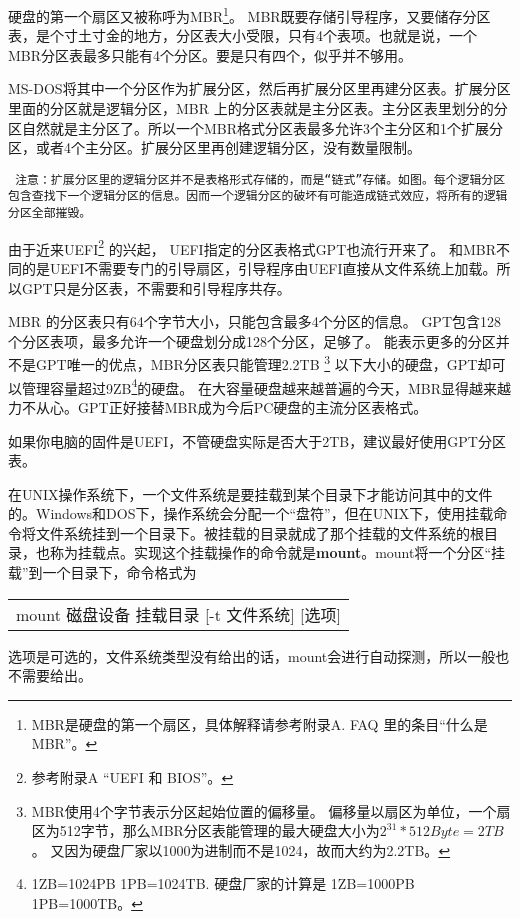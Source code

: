 \documentclass[amstex,twoside]{ctexbook}
\newenvironment{notice}{\tt}{}
\newenvironment{code}{\small\tt\begin{longtable}{p{0.8\textwidth}}}{\end{longtable}}
\begin{document}
硬盘的第一个扇区又被称呼为MBR\footnote{MBR是硬盘的第一个扇区，具体解释请参考附录A. FAQ 里的条目“什么是 MBR”。}。
MBR既要存储引导程序，又要储存分区表，是个寸土寸金的地方，分区表大小受限，只有4个表项。也就是说，一个 MBR分区表最多只能有4个分区。要是只有四个，似乎并不够用。

MS-DOS将其中一个分区作为扩展分区，然后再扩展分区里再建分区表。扩展分区里面的分区就是逻辑分区，MBR 上的分区表就是主分区表。主分区表里划分的分区自然就是主分区了。所以一个MBR格式分区表最多允许3个主分区和1个扩展分区，或者4个主分区。扩展分区里再创建逻辑分区，没有数量限制。

\begin{notice}
注意：扩展分区里的逻辑分区并不是表格形式存储的，而是“链式”存储。如图。每个逻辑分区包含查找下一个逻辑分区的信息。因而一个逻辑分区的破坏有可能造成链式效应，将所有的逻辑分区全部摧毁。
\end{notice}

由于近来UEFI\footnote{参考附录A “UEFI 和 BIOS”。}  的兴起，
UEFI指定的分区表格式GPT也流行开来了。
和MBR不同的是UEFI不需要专门的引导扇区，引导程序由UEFI直接从文件系统上加载。所以GPT只是分区表，不需要和引导程序共存。

MBR 的分区表只有64个字节大小，只能包含最多4个分区的信息。
GPT包含128个分区表项，最多允许一个硬盘划分成128个分区，足够了。
能表示更多的分区并不是GPT唯一的优点，MBR分区表只能管理2.2TB
\footnote{MBR使用4个字节表示分区起始位置的偏移量。
偏移量以扇区为单位，一个扇区为512字节，那么MBR分区表能管理的最大硬盘大小为$2^{31}*512Byte = 2TB$。
又因为硬盘厂家以1000为进制而不是1024，故而大约为2.2TB。}%
以下大小的硬盘，GPT却可以管理容量超过9ZB\footnote{1ZB=1024PB 1PB=1024TB. 硬盘厂家的计算是 1ZB=1000PB 1PB=1000TB。}的硬盘。
在大容量硬盘越来越普遍的今天，MBR显得越来越力不从心。GPT正好接替MBR成为今后PC硬盘的主流分区表格式。

如果你电脑的固件是UEFI，不管硬盘实际是否大于2TB，建议最好使用GPT分区表。

在UNIX操作系统下，一个文件系统是要挂载到某个目录下才能访问其中的文件的。Windows和DOS下，操作系统会分配一个“盘符”，但在UNIX下，使用挂载命令将文件系统挂到一个目录下。被挂载的目录就成了那个挂载的文件系统的根目录，也称为挂载点。实现这个挂载操作的命令就是\textbf{mount}。mount将一个分区“挂载”到一个目录下，命令格式为

\begin{code}
mount 磁盘设备  挂载目录 [-t 文件系统] [选项]
\end{code}

选项是可选的，文件系统类型没有给出的话，mount会进行自动探测，所以一般也不需要给出。
\end{document}
